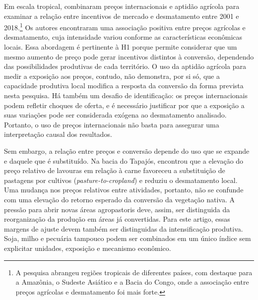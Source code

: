 Em escala tropical,  combinaram preços internacionais e aptidão agrícola para examinar a relação entre incentivos de mercado e desmatamento entre 2001 e 2018.\footnote{A pesquisa abrangeu regiões tropicais de diferentes países, com destaque para a Amazônia, o Sudeste Asiático e a Bacia do Congo, onde a associação entre preços agrícolas e desmatamento foi mais forte.} Os autores encontraram uma associação positiva entre preços agrícolas e desmatamento, cuja intensidade variou conforme as características econômicas locais. Essa abordagem é pertinente à H1 porque permite considerar que um mesmo aumento de preço pode gerar incentivos distintos à conversão, dependendo das possibilidades produtivas de cada território. O uso da aptidão agrícola para medir a exposição aos preços, contudo, não demonstra, por si só, que a capacidade produtiva local modifica a resposta da conversão da forma prevista nesta pesquisa. Há também um desafio de identificação: os preços internacionais podem refletir choques de oferta, e é necessário justificar por que a exposição a suas variações pode ser considerada exógena ao desmatamento analisado. Portanto, o uso de preços internacionais não basta para assegurar uma interpretação causal dos resultados.

Sem embargo, a relação entre preços e conversão depende do uso que se expande e daquele que é substituído. Na bacia do Tapajós,  encontrou que a elevação do preço relativo de lavouras em relação à carne favoreceu a substituição de pastagens por cultivos (\textit{pasture-to-cropland}) e reduziu o desmatamento local. Uma mudança nos preços relativos entre atividades, portanto, não se confunde com uma elevação do retorno esperado da conversão da vegetação nativa. A pressão para abrir novas áreas agropastoris deve, assim, ser distinguida da reorganização da produção em áreas já convertidas. Para este artigo, essas margens de ajuste devem também ser distinguidas da intensificação produtiva. Soja, milho e pecuária tampouco podem ser combinados em um único índice sem explicitar unidades, exposição e mecanismo econômico.

